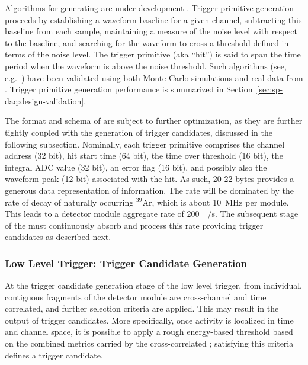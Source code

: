 
Algorithms for generating  are under development
\cite{bib:docdb11275}.  Trigger primitive generation proceeds
by establishing a waveform baseline
for a given channel, subtracting this baseline from each sample, maintaining
a measure of the noise level with respect to the baseline, and searching for the waveform to cross a
threshold defined in terms of the noise level. 
The  trigger primitive  (aka ``hit'') is said to span the time period when the waveform is above the noise threshold.
Such algorithms (see, e.g.~\cite{bib:docdb11236}) have been validated
using both Monte Carlo simulations and 
real data from . 
Trigger primitive generation performance is summarized in
Section~\ref{sec:sp-daq:design-validation}.

The format and schema of  are subject to further
optimization, as they are further tightly coupled with the generation of
trigger candidates, discussed in the following subsection. Nominally,
each trigger primitive comprises the channel address (32 bit), hit
start time (64 bit), the time over
threshold (16 bit), the integral ADC value (32 bit), an error flag (16
bit), and possibly also
the waveform peak (12 bit) associated with the hit. 
As such, 20-22 bytes provides a generous data
representation of  information. 
The  rate will be dominated by the rate of decay of naturally occurring
$^{39}$Ar, which is about \SI{10}{\mega\hertz} per module.
This leads to a detector module aggregate rate of
\SI{200}{\mega\byte/\second}.
The subsequent stage of the  must continuously absorb and process this
rate providing trigger candidates as described next.

\subsubsection{Low Level Trigger: Trigger Candidate Generation}

At the trigger candidate generation stage of the low level trigger,
 from individual, contiguous fragments of the
detector 
module are cross-channel and time correlated, and further selection
criteria are applied. This may result in the
output of trigger candidates. 
More specifically, once activity is localized in time and channel
space, it is
possible to apply a rough energy-based threshold based on the combined
metrics carried by the cross-correlated ;
satisfying this criteria defines a trigger candidate. 

